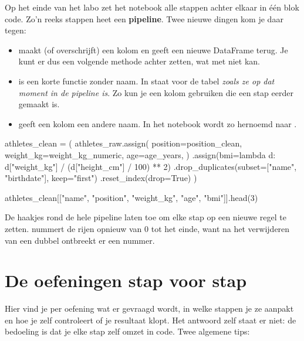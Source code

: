 \documentclass[11pt,a4paper]{article}
\begin{document}
Op het einde van het labo zet het notebook alle stappen achter elkaar in
één blok code. Zo'n reeks stappen heet een \textbf{pipeline}. Twee nieuwe
dingen kom je daar tegen:

\begin{itemize}
  \item {} maakt (of overschrijft) een kolom en
        geeft een nieuwe DataFrame terug. Je kunt er dus een volgende
        methode achter zetten, wat met  niet kan.
  \item {} is een korte functie zonder naam. In
         staat 
        voor de tabel \emph{zoals ze op dat moment in de pipeline is}.
        Zo kun je een kolom gebruiken die een stap eerder gemaakt is.
  \item {} geeft een kolom een
        andere naam. In het notebook wordt zo  hernoemd naar
        .
\end{itemize}

\begin{python}[noout]
athletes_clean = (
    athletes_raw.assign(
        position=position_clean,
        weight_kg=weight_kg_numeric,
        age=age_years,
    )
    .assign(bmi=lambda d: d["weight_kg"] / (d["height_cm"] / 100) ** 2)
    .drop_duplicates(subset=["name", "birthdate"], keep="first")
    .reset_index(drop=True)
)
\end{python}
\begin{python}
athletes_clean[["name", "position", "weight_kg", "age", "bmi"]].head(3)
\end{python}

De haakjes rond de hele pipeline laten toe om elke stap op een nieuwe
regel te zetten.  nummert de rijen opnieuw
van 0 tot het einde, want na het verwijderen van een dubbel ontbreekt er
een nummer.

\section{De oefeningen stap voor stap}

Hier vind je per oefening wat er gevraagd wordt, in welke stappen je ze
aanpakt en hoe je zelf controleert of je resultaat klopt. Het antwoord
zelf staat er niet: de bedoeling is dat je elke stap zelf omzet in code.
Twee algemene tips:
\end{document}
